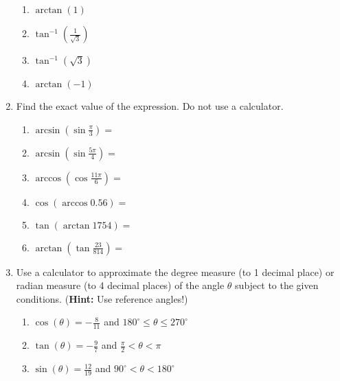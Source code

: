 \begin{enumerate}
\begin{enumerate}
\item $\arctan \left( 1 \right)$
\vfill

\item $\tan^{-1} \left( \frac{1}{\sqrt{3}}\right)$
\vfill

\item $\tan^{-1} \left(\sqrt{3}\right)$
\vfill

\item $\arctan \left( -1 \right)$
\vfill
\end{enumerate}




\newpage
\item Find the exact value of the expression.  Do not use a calculator.

\begin{enumerate}

\item $\arcsin \left(\sin \frac{\pi}{3}\right)=$
\vfill

\item $\arcsin \left(\sin \frac{5\pi}{4}\right)=$
\vfill

\item $\arccos \left(\cos \frac{11\pi}{6}\right)=$
\vfill


\item $\cos \left( \arccos 0.56 \right) = $
\vfill

\item $\tan \left( \arctan 1754 \right)=$
\vfill

\item $\arctan \left( \tan \frac{23}{814}\right)=$
\vfill

\end{enumerate}


\newpage

\item Use a calculator to approximate the degree measure (to 1 decimal place) or radian measure (to 4 decimal places) of the angle $\theta$ subject to the given conditions. (\textbf{Hint:  }Use reference angles!)

\begin{enumerate}
\item $\displaystyle \cos(\theta)=-\frac{8}{11}$ and $180^\circ \leq \theta \leq 270^\circ$
\vfill
\item $\displaystyle \tan(\theta)=-\frac{9}{7}$ and $\frac{\pi}{2}<\theta< \pi$
\vfill
\item $\displaystyle \sin(\theta)=\frac{12}{19}$ and $90^\circ < \theta <180^\circ$
\vfill
\end{enumerate}



\end{enumerate}
